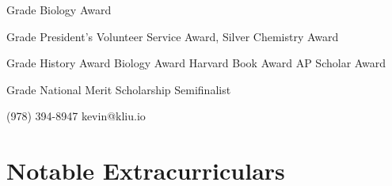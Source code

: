 \documentclass[paper=letter]{tccv}
\begin{document}
\begin{yearlist}

\item{ Grade}
     {Biology Award}
     {}

\item{ Grade}
     {President's Volunteer Service Award, Silver\newline
     Chemistry Award}
     {}

\item{ Grade}
    {History Award\newline
     Biology Award\newline
     Harvard Book Award\newline
     AP Scholar Award}
     {}

\item{ Grade}
    {National Merit Scholarship Semifinalist}
     {}

\end{yearlist}

    {(978) 394-8947}
    {kevin@kliu.io}

\section{Notable Extracurriculars}
\end{document}
